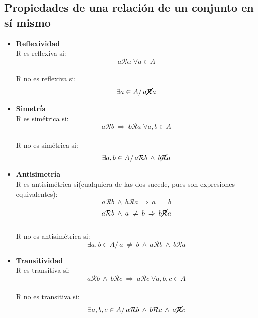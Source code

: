 \documentclass{article}
\newcommand{\lands}{\:\land\:}                          %
\newcommand{\tq}{/\,}                                   %
\newcommand{\eq}{\:=\:}                                 %
\newcommand{\neqs}{\:\neq\:}                            %
\newcommand{\relates}{\mathcal{R}}                      %
\newcommand{\Rightarrows}{\: \Rightarrow \:}            %
\begin{document}
\subsection{Propiedades de una relación de un conjunto en sí mismo}
\begin{itemize}
    \item \textbf{Reflexividad}
    \\R es reflexiva si:
    \begin{equation*}
        a\mathcal{R}a \; \forall a \in A
    \end{equation*}
    \\R no es reflexiva si: 
    \begin{equation*}
    \exists a \in A \tq a \cancel{\mathcal{R}} a
    \end{equation*}
    \item \textbf{Simetría}
    \\R es simétrica si:
    \begin{equation*}
        a\mathcal{R}b \Rightarrows b\mathcal{R}a \; \forall a,b \in A
    \end{equation*}
    \\R no es simétrica si:
    \begin{equation*}
        \exists a,b \in A \tq a\relates b \lands b\cancel{\mathcal{R}}a
    \end{equation*}
    \item \textbf{Antisimetría}
    \\R es antisimétrica si(cualquiera de las dos sucede, pues son expresiones equivalentes):
    \begin{equation*}
        a \relates b \lands b \relates a \Rightarrows a \eq b
    \end{equation*}
    \begin{equation*}
        a \relates b \lands a \neqs b \Rightarrows b \cancel{\relates} a 
    \end{equation*}
    \\R no es antisimétrica si:
    \begin{equation*}
        \exists a,b \in A \tq a \neqs b \lands a \relates b \lands b \relates a
    \end{equation*}
    \item \textbf{Transitividad}
    \\R es transitiva si: 
    \begin{equation*}
        a \relates b \lands b \relates c \Rightarrows a \relates c \; \forall a,b,c \in A
    \end{equation*}
    \\R no es transitiva si:
    \begin{equation*}
        \exists a,b,c \in A \tq a \relates b \lands b \relates c \lands a \cancel{\relates} c
    \end{equation*}
\end{itemize}
\end{document}
